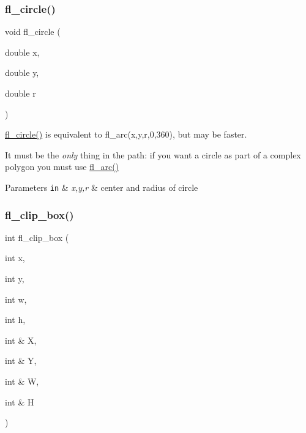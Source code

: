 \subsubsection{\texorpdfstring{fl\+\_\+circle()}{fl\_circle()}}
{\footnotesize\ttfamily void fl\+\_\+circle (\begin{DoxyParamCaption}\item[{double}]{x,  }\item[{double}]{y,  }\item[{double}]{r }\end{DoxyParamCaption})\hspace{0.3cm}{\ttfamily [inline]}}

\hyperlink{group__fl__drawings_gac4540eaf7b5f23944cf332fc8f81f57e}{fl\+\_\+circle()} is equivalent to fl\+\_\+arc(x,y,r,0,360), but may be faster.

It must be the {\itshape only} thing in the path\+: if you want a circle as part of a complex polygon you must use \hyperlink{group__fl__drawings_ga3c1216fb40b6274acff72cca64b86a69}{fl\+\_\+arc()} 
\begin{DoxyParams}[1]{Parameters}
\mbox{\tt in}  & {\em x,y,r} & center and radius of circle \\
\hline
\end{DoxyParams}
\mbox{\label{group__fl__drawings_ga6ec7356beb51a8f1d2b987f4d00f42d8}} 
\subsubsection{\texorpdfstring{fl\+\_\+clip\+\_\+box()}{fl\_clip\_box()}}
{\footnotesize\ttfamily int fl\+\_\+clip\+\_\+box (\begin{DoxyParamCaption}\item[{int}]{x,  }\item[{int}]{y,  }\item[{int}]{w,  }\item[{int}]{h,  }\item[{int \&}]{X,  }\item[{int \&}]{Y,  }\item[{int \&}]{W,  }\item[{int \&}]{H }\end{DoxyParamCaption})\hspace{0.3cm}{\ttfamily [inline]}}

